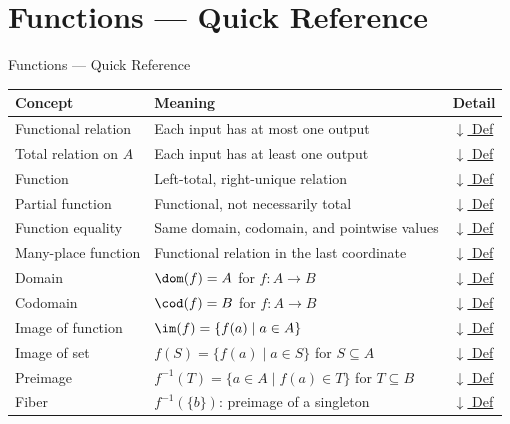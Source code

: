 \section{Functions --- Quick Reference}


\begin{toolkitbox}{Functions --- Quick Reference}
\small
\begin{tabular}{l l l}
\toprule
\textbf{Concept} & \textbf{Meaning} & \textbf{Detail} \\
\midrule
Functional relation & Each input has at most one output                         & \hyperref[def:functional-relation]{$\downarrow$ Def} \\
Total relation on $A$ & Each input has at least one output                       & \hyperref[def:total-relation-on-domain]{$\downarrow$ Def} \\
Function         & Left-total, right-unique relation                            & \hyperref[def:function]{$\downarrow$ Def} \\
Partial function & Functional, not necessarily total                            & \hyperref[def:partial-function]{$\downarrow$ Def} \\
Function equality & Same domain, codomain, and pointwise values                 & \hyperref[def:function-equality]{$\downarrow$ Def} \\
Many-place function & Functional relation in the last coordinate                 & \hyperref[def:many-place-functional-relation]{$\downarrow$ Def} \\
Domain           & $\dom(f)=A$ for $f:A\to B$                                 & \hyperref[def:domain]{$\downarrow$ Def} \\
Codomain         & $\cod(f)=B$ for $f:A\to B$                                  & \hyperref[def:codomain]{$\downarrow$ Def} \\
Image of function & $\im(f) = \{f(a) \mid a \in A\}$                            & \hyperref[def:image-function]{$\downarrow$ Def} \\
Image of set      & $f(S) = \{f(a) \mid a \in S\}$ for $S \subseteq A$          & \hyperref[def:image-set]{$\downarrow$ Def} \\
Preimage          & $f^{-1}(T) = \{a \in A \mid f(a) \in T\}$ for $T \subseteq B$ & \hyperref[def:preimage]{$\downarrow$ Def} \\
Fiber             & $f^{-1}(\{b\})$: preimage of a singleton                    & \hyperref[def:fiber]{$\downarrow$ Def} \\

\end{tabular}
\end{toolkitbox}
